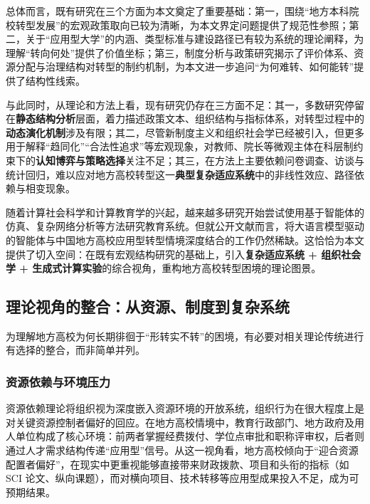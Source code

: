 \documentclass[UTF8, zihao=-4, fontset=mac]{ctexart}
\begin{document}
总体而言，既有研究在三个方面为本文奠定了重要基础：第一，围绕“地方本科院校转型发展”的宏观政策取向已较为清晰，为本文界定问题提供了规范性参照\cite{pan2014transformation, zhong2014applied}；第二，关于“应用型大学”的内涵、类型标准与建设路径已有较为系统的理论阐释，为理解“转向何处”提供了价值坐标\cite{qu2014connotation}；第三，制度分析与政策研究揭示了评价体系、资源分配与治理结构对转型的制约机制，为本文进一步追问“为何难转、如何能转”提供了结构性线索\cite{mok2005globalization, cai2014institutional}。

与此同时，从理论和方法上看，现有研究仍存在三方面不足：其一，多数研究停留在\textbf{静态结构分析}层面，着力描述政策文本、组织结构与指标体系，对转型过程中的\textbf{动态演化机制}涉及有限；其二，尽管新制度主义和组织社会学已经被引入，但更多用于解释“趋同化”“合法性追求”等宏观现象，对教师、院长等微观主体在科层制约束下的\textbf{认知博弈与策略选择}关注不足\cite{dimaggio1983iron, meyer1977institutionalized}；其三，在方法上主要依赖问卷调查、访谈与统计回归，难以应对地方高校转型这一\textbf{典型复杂适应系统}中的非线性效应、路径依赖与相变现象\cite{holland1995hidden, miller2007complex}。

随着计算社会科学和计算教育学的兴起，越来越多研究开始尝试使用基于智能体的仿真、复杂网络分析等方法研究教育系统\cite{lazer2009life, epstein2006generative, zhang2023computational}。但就公开文献而言，将大语言模型驱动的智能体与中国地方高校应用型转型情境深度结合的工作仍然稀缺。这恰恰为本文提供了切入空间：在既有宏观结构研究的基础上，引入\textbf{复杂适应系统 + 组织社会学 + 生成式计算实验}的综合视角，重构地方高校转型困境的理论图景。

\subsection{理论视角的整合：从资源、制度到复杂系统}

为理解地方高校为何长期徘徊于“形转实不转”的困境，有必要对相关理论传统进行有选择的整合，而非简单并列。

\subsubsection{资源依赖与环境压力}

资源依赖理论将组织视为深度嵌入资源环境的开放系统，组织行为在很大程度上是对关键资源控制者偏好的回应\cite{arthur1999complexity}。在地方高校情境中，教育行政部门、地方政府及用人单位构成了核心环境：前两者掌握经费拨付、学位点审批和职称评审权，后者则通过人才需求结构传递“应用型”信号。从这一视角看，地方高校倾向于“迎合资源配置者偏好”，在现实中更重视能够直接带来财政拨款、项目和头衔的指标（如 SCI 论文、纵向课题），而对横向项目、技术转移等应用型成果投入不足，成为可预期结果。
\end{document}
